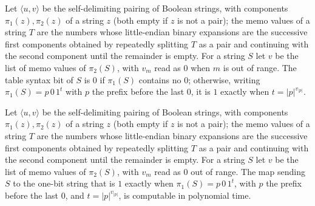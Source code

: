 \begin{definition}
\label{Complexity.ladner_tableSyntax}
\leanok
{}
Let $\langle u,v\rangle$ be the self-delimiting pairing of Boolean strings, with components $\pi_1(z),\pi_2(z)$ of a string $z$ (both empty if $z$ is not a pair); the memo values of a string $T$ are the numbers whose little-endian binary expansions are the successive first components obtained by repeatedly splitting $T$ as a pair and continuing with the second component until the remainder is empty. For a string $S$ let $v$ be the list of memo values of $\pi_2(S)$, with $v_m$
read as $0$ when $m$ is out of range. The table syntax bit of $S$ is $0$ if $\pi_1(S)$ contains
no $0$; otherwise, writing $\pi_1(S)=p\,0\,1^t$ with $p$ the prefix before the last $0$, it is $1$
exactly when $t=|p|^{v_{|p|}}$.
\end{definition}

\begin{theorem}
\label{Complexity.ladner_tableSyntax_FP}
\leanok
{}
Let $\langle u,v\rangle$ be the self-delimiting pairing of Boolean strings, with components $\pi_1(z),\pi_2(z)$ of a string $z$ (both empty if $z$ is not a pair); the memo values of a string $T$ are the numbers whose little-endian binary expansions are the successive first components obtained by repeatedly splitting $T$ as a pair and continuing with the second component until the remainder is empty. For a string $S$ let $v$ be the list of memo values of $\pi_2(S)$, with $v_m$
read as $0$ out of range. The map sending $S$ to the one-bit string that is $1$ exactly when
$\pi_1(S)=p\,0\,1^t$, with $p$ the prefix before the last $0$, and $t=|p|^{v_{|p|}}$, is
computable in polynomial time.
\end{theorem}

